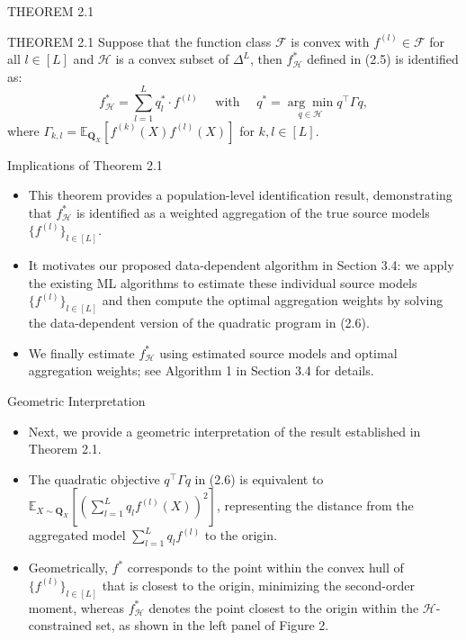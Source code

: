 \documentclass{beamer}
\begin{document}
\begin{frame}{THEOREM 2.1}
    \begin{block}{THEOREM 2.1}
        Suppose that the function class $\mathcal{F}$ is convex with $f^{(l)} \in \mathcal{F}$ for all $l \in [L]$ and $\mathcal{H}$ is a convex subset of $\Delta^{L}$, then $f_{\mathcal{H}}^{*}$ defined in (2.5) is identified as:
        \[
        f_{\mathcal{H}}^{*} = \sum_{l = 1}^{L} q_{l}^{*} \cdot f^{(l)} \quad \text{ with } \quad q^{*} = \underset{q \in \mathcal{H}}{\arg \min} q^{\intercal} \Gamma q, 
        \]
        where $\Gamma_{k, l} = \mathbb{E}_{\mathbf{Q}_{X}}[ f^{(k)}(X) f^{(l)}(X) ]$ for $k, l \in [L]$.
    \end{block}
\end{frame}

\begin{frame}{Implications of Theorem 2.1}
    \begin{itemize}
        \item This theorem provides a population-level identification result, demonstrating that $f_{\mathcal{H}}^{*}$ is identified as a weighted aggregation of the true source models $\{ f^{(l)} \}_{l \in [L]}$.
        \item It motivates our proposed data-dependent algorithm in Section 3.4: we apply the existing ML algorithms to estimate these individual source models $\{ f^{(l)} \}_{l \in [L]}$ and then compute the optimal aggregation weights by solving the data-dependent version of the quadratic program in (2.6).
        \item We finally estimate $f_{\mathcal{H}}^{*}$ using estimated source models and optimal aggregation weights; see Algorithm 1 in Section 3.4 for details.
    \end{itemize}
\end{frame}

\begin{frame}{Geometric Interpretation}
    \begin{itemize}
        \item Next, we provide a geometric interpretation of the result established in Theorem 2.1.
        \item The quadratic objective $q^{\intercal} \Gamma q$ in (2.6) is equivalent to $\mathbb{E}_{X \sim \mathbf{Q}_{X}}[ (\sum_{l=1}^{L} q_l f^{(l)}(X) )^{2} ]$, representing the distance from the aggregated model $\sum_{l=1}^{L} q_l f^{(l)}$ to the origin.
        \item Geometrically, $f^{*}$ corresponds to the point within the convex hull of $\{ f^{(l)} \}_{l \in [L]}$ that is closest to the origin, minimizing the second-order moment, whereas $f_{\mathcal{H}}^{*}$ denotes the point closest to the origin within the $\mathcal{H}$-constrained set, as shown in the left panel of Figure 2.
    \end{itemize}
\end{frame}
\end{document}
